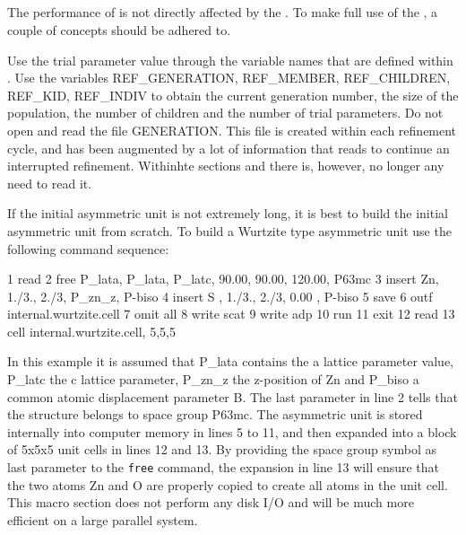 \subsection{\discus}

The performance of \Discus is not directly affected by the \suite. To make 
full use of the \suite, a couple of concepts should be adhered to.

Use the trial parameter value through the variable names that are defined
within \Diffev. 
Use the variables
REF\_GENERATION, REF\_MEMBER, REF\_CHILDREN, REF\_KID, REF\_INDIV 
to obtain the current
generation number, the size of the population, the number of children 
and the number of trial parameters.  Do not open and read the file GENERATION.
This file is created within each refinement cycle, and has been augmented 
by a lot of information that \Diffev reads to continue an interrupted refinement.
Withinhte sections \Discus and \Kuplot there is, however, 
no longer any need to read it.



If the initial asymmetric unit is not extremely long, it is best to build
the initial asymmetric unit from scratch. To build a Wurtzite type asymmetric
unit use the following command sequence:

\begin{MacVerbatim}
1   read
2      free P_lata, P_lata, P_latc, 90.00, 90.00, 120.00, P63mc
3   insert Zn, 1./3.,  2./3, P_zn_z, P-biso
4   insert S , 1./3.,  2./3, 0.00  , P-biso
5   save
6      outf internal.wurtzite.cell
7      omit all
8      write scat
9      write adp
10     run
11  exit
12  read
13     cell internal.wurtzite.cell, 5,5,5
\end{MacVerbatim}

In this example it is assumed that P\_lata      contains the a lattice parameter 
value, P\_latc      the c lattice parameter, P\_zn\_z     the z-position of Zn 
and P\_biso     
a common atomic displacement parameter B. The last parameter in line 2 tells
\Discus that the structure belongs to space group P63mc. The asymmetric unit
is stored internally into computer memory  in lines 5 to 11, and then expanded
into a block of 5x5x5 unit cells in lines 12 and 13. By providing the space
group symbol as last parameter to the {\tt free} command, the expansion in line
13 will ensure that the two atoms Zn and O are properly copied to create all
atoms in the unit cell. This macro section does not perform any disk I/O and
will be much more efficient on a large parallel system.

